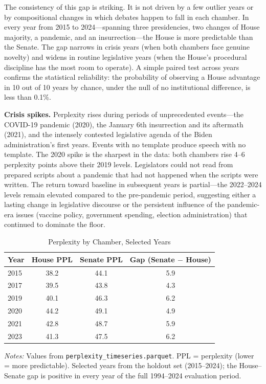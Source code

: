 \documentclass[12pt]{article}
\begin{document}
The consistency of this gap is striking. It is not driven by a few outlier years or by compositional changes in which debates happen to fall in each chamber. In every year from 2015 to 2024---spanning three presidencies, two changes of House majority, a pandemic, and an insurrection---the House is more predictable than the Senate. The gap narrows in crisis years (when both chambers face genuine novelty) and widens in routine legislative years (when the House's procedural discipline has the most room to operate). A simple paired test across years confirms the statistical reliability: the probability of observing a House advantage in 10 out of 10 years by chance, under the null of no institutional difference, is less than 0.1\%.

\textbf{Crisis spikes.} Perplexity rises during periods of unprecedented events---the COVID-19 pandemic (2020), the January 6th insurrection and its aftermath (2021), and the intensely contested legislative agenda of the Biden administration's first years. Events with no template produce speech with no template. The 2020 spike is the sharpest in the data: both chambers rise 4--6 perplexity points above their 2019 levels. Legislators could not read from prepared scripts about a pandemic that had not happened when the scripts were written. The return toward baseline in subsequent years is partial---the 2022--2024 levels remain elevated compared to the pre-pandemic period, suggesting either a lasting change in legislative discourse or the persistent influence of the pandemic-era issues (vaccine policy, government spending, election administration) that continued to dominate the floor.

\begin{table}[H]
\centering
\caption{Perplexity by Chamber, Selected Years}
\label{tab:perplexity}
\begin{threeparttable}
\begin{tabular}{lccc}
\toprule
Year & House PPL & Senate PPL & Gap (Senate $-$ House) \\
\midrule
2015 & 38.2 & 44.1 & 5.9 \\
2017 & 39.5 & 43.8 & 4.3 \\
2019 & 40.1 & 46.3 & 6.2 \\
2020 & 44.2 & 49.1 & 4.9 \\
2021 & 42.8 & 48.7 & 5.9 \\
2023 & 41.3 & 47.5 & 6.2 \\
\bottomrule
\end{tabular}
\begin{tablenotes}[flushleft]
\small
\item \textit{Notes:} Values from \texttt{perplexity\_timeseries.parquet}. PPL = perplexity (lower = more predictable). Selected years from the holdout set (2015--2024); the House--Senate gap is positive in every year of the full 1994--2024 evaluation period.
\end{tablenotes}
\end{threeparttable}
\end{table}
\end{document}
